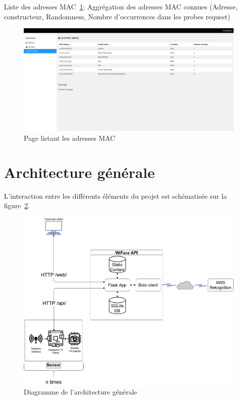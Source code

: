 Liste des adresses MAC~\ref{fig:list_mac}: Aggrégation des adresses MAC connues (Adresse, constructeur, Randomness, Nombre d'occurrences dans les probes request)
\begin{figure}[H]
	\centering
	\includegraphics[width=16cm]{images/dashboard/list-macs.png}
	\caption{Page listant les adresses MAC}
	\label{fig:list_mac}
\end{figure}

\section{Architecture générale}

L'interaction entre les différents éléments du projet est schématisée sur
la figure~\ref{fig:diag_archi}.

\begin{figure}[H]
	\centering
	\includegraphics[width=16cm]{images/conception/diagram_archi.png}
	\caption{Diagramme de l'architecture générale}
	\label{fig:diag_archi}
\end{figure}

